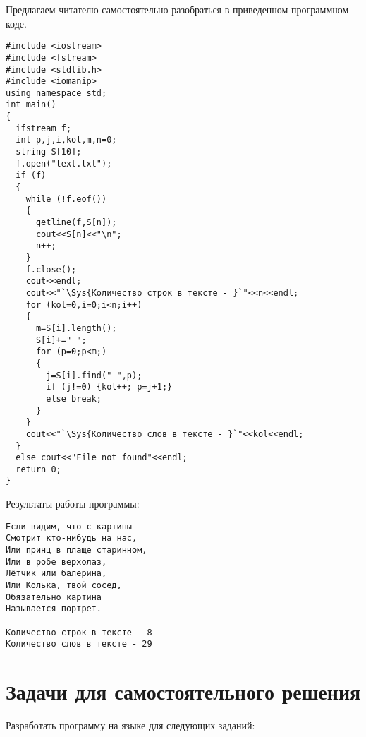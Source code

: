 
Предлагаем читателю самостоятельно разобраться в приведенном программном коде. 
\begin{lstlisting}
#include <iostream>
#include <fstream>
#include <stdlib.h>
#include <iomanip>
using namespace std;
int main()
{
  ifstream f;
  int p,j,i,kol,m,n=0;
  string S[10];
  f.open("text.txt");
  if (f)
  {
    while (!f.eof())
    {
      getline(f,S[n]);
      cout<<S[n]<<"\n";
      n++;
    }
    f.close();
    cout<<endl;
    cout<<"`\Sys{Количество строк в тексте - }`"<<n<<endl;
    for (kol=0,i=0;i<n;i++)
    {
      m=S[i].length();
      S[i]+=" ";
      for (p=0;p<m;)
      {
        j=S[i].find(" ",p);
        if (j!=0) {kol++; p=j+1;}
        else break;
      }
    }
    cout<<"`\Sys{Количество слов в тексте - }`"<<kol<<endl;
  }
  else cout<<"File not found"<<endl;
  return 0;
}
\end{lstlisting}
Результаты работы программы:
\begin{verbatim}
Если видим, что с картины
Смотрит кто-нибудь на нас,
Или принц в плаще старинном,
Или в робе верхолаз,
Лётчик или балерина,
Или Колька, твой сосед,
Обязательно картина
Называется портрет.

Количество строк в тексте - 8
Количество слов в тексте - 29
\end{verbatim}

\section[Задачи для самостоятельного решения]{Задачи для самостоятельного решения}
Разработать программу на языке  для следующих заданий:

